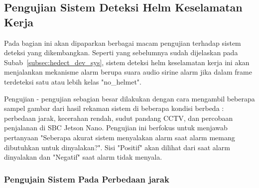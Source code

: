 \subsection{Pengujian Sistem Deteksi Helm Keselamatan Kerja}
\label{subsec:hedect_sys_test}


\par Pada bagian ini akan dipaparkan berbagai macam pengujian terhadap sistem deteksi yang dikembangkan. Seperti yang sebelumnya sudah dijelaskan pada Subab~\ref{subsec:hedect_dev_sys}, sistem deteksi helm keselamatan kerja ini akan menjalankan mekanisme alarm berupa suara audio sirine alarm jika dalam frame terdeteksi satu atau lebih kelas "no\_helmet".


\par Pengujian - pengujian sebagian besar dilakukan dengan cara mengambil beberapa sampel gambar dari hasil rekaman sistem di beberapa kondisi berbeda : perbedaan jarak, kecerahan rendah, sudut pandang CCTV, dan percobaan penjalanan di SBC Jetson Nano. Pengujian ini berfokus untuk menjawab pertanyaan "Seberapa akurat sistem menyalakan alarm saat alarm memang dibutuhkan untuk dinyalakan?". Sisi "Positif" akan dilihat dari saat alarm dinyalakan dan "Negatif" saat alarm tidak menyala. 

\subsubsection{Pengujain Sistem Pada Perbedaan jarak}
\label{subsubsec:hedect_test_dist}


